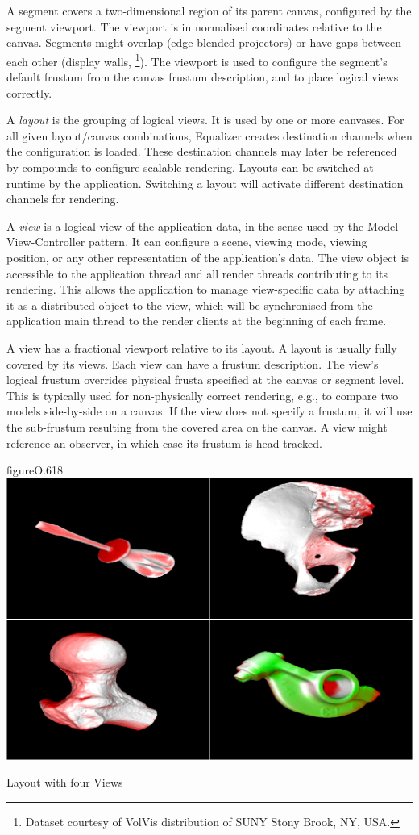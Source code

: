 A segment covers a two-dimensional region of its parent canvas, configured by
the segment viewport. The viewport is in normalised coordinates relative to the
canvas. Segments might overlap (edge-blended projectors) or have gaps between
each other (display walls, \footnote{Dataset courtesy of VolVis
distribution of SUNY Stony Brook, NY, USA.}). The viewport is used to configure
the segment's default frustum from the canvas frustum description, and to place
logical views correctly.

A {\em layout} is the grouping of logical views. It is used by one or more
canvases. For all given layout/canvas combinations, Equalizer creates
destination channels when the configuration is loaded. These destination
channels may later be referenced by compounds to configure scalable rendering.
Layouts can be switched at runtime by the application. Switching a layout will
activate different destination channels for rendering.

A {\em view} is a logical view of the application data, in the sense used by
the Model-View-Controller pattern. It can configure a scene, viewing mode,
viewing position, or any other representation of the application's data. The
view object is accessible to the application thread and all render threads
contributing to its rendering. This allows the application to manage
view-specific data by attaching it as a distributed object to the view, which
will be synchronised from the application main thread to the render clients at the beginning of each frame.

A view has a fractional viewport relative to its layout. A layout is usually
fully covered by its views. Each view can have a frustum description. The
view's logical frustum overrides physical frusta specified at the canvas or
segment level. This is typically used for non-physically correct rendering,
e.g., to compare two models side-by-side on a canvas. If the view does not
specify a frustum, it will use the sub-frustum resulting from the covered area
on the canvas. A view might reference an observer, in which case its frustum is
head-tracked.

\begin{wrapfloat}{figure}{O}{.618\textwidth}
 \includegraphics[width=.618\textwidth]{images/layout.png}
 {\caption{\label{fLayout}Layout with four Views}}\vspace{-0.5ex}
\end{wrapfloat}

